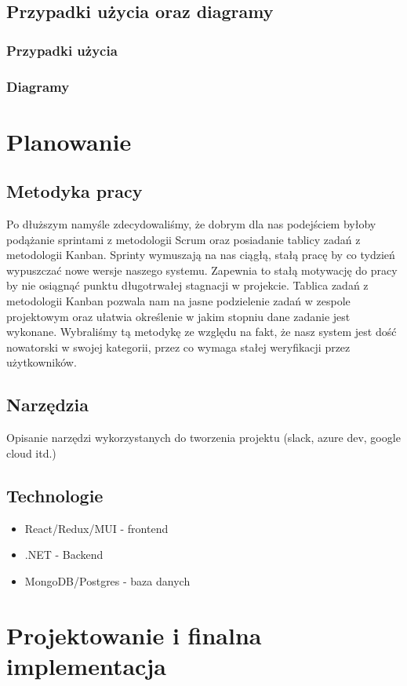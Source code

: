 \documentclass[a4paper,11pt]{report}
\begin{document}
\section{Przypadki użycia oraz diagramy}
\subsection{Przypadki użycia}
\subsection{Diagramy}
\chapter {Planowanie}
\section{Metodyka pracy}
Po dłuższym namyśle zdecydowaliśmy, że dobrym dla nas podejściem byłoby podążanie sprintami z metodologii Scrum oraz posiadanie tablicy zadań z metodologii Kanban\cite{agile}.  Sprinty wymuszają na nas ciągłą, stałą pracę by co tydzień wypuszczać nowe wersje naszego systemu. Zapewnia to stałą motywację do pracy by nie osiągnąć punktu długotrwałej stagnacji w projekcie. Tablica zadań z metodologii Kanban pozwala nam na jasne podzielenie zadań w zespole projektowym oraz ułatwia określenie w jakim stopniu dane zadanie jest wykonane. Wybraliśmy tą metodykę ze względu na fakt, że nasz system jest dość nowatorski w swojej kategorii, przez co wymaga stałej weryfikacji przez użytkowników.
\section{Narzędzia}
Opisanie narzędzi wykorzystanych do tworzenia projektu (slack, azure dev, google cloud itd.)
\section{Technologie}
		\begin{itemize}
			\item React/Redux/MUI - frontend
			\item .NET - Backend
			\item MongoDB/Postgres - baza danych
		\end{itemize}

\chapter {Projektowanie i finalna implementacja}
\end{document}
